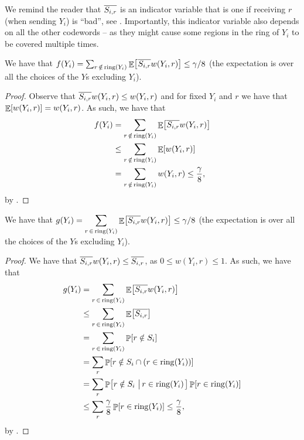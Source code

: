 We remind the reader that $\overline{S_{{i},{r}}}$
is an indicator variable that is one if receiving $r$ (when sending
$Y_i$) is ``bad'', see     . Importantly, this
indicator variable also depends on all the other codewords -- as they
might cause some regions in the ring of $Y_i$ to be covered multiple times.


\begin{lemma}
    We have that
    \begin{math}
        f(Y_i )%
        =%
        \sum_{r \,\notin\, \sring{Y_i}} \Ex{\bigl.\ts
           \smash{\NotInS{i}{r}} w(Y_i, r) } \leq \gamma/8
    \end{math}
    (the expectation is over all the
    choices of the $Y$s excluding $Y_i$).
\end{lemma}
\begin{proof}
    Observe that $\overline{S_{{i},{r}}} w(Y_i, r) \leq w(Y_i,r)$ and for fixed
    $Y_i$ and $r$ we have that $\mathop{\mathbb{E}}\!\left[ {w(Y_i,r)} \right] = w(Y_i,r)$.  As such,
    we have that
    \begin{align*}
        f(Y_i) &= \sum_{r \,\notin\, \sring{Y_i}} \Ex{ \NotInS{i}{r}
           w(Y_i, r) }\\
        &\leq %
        \sum_{r \,\notin\, \sring{Y_i}} \Ex{ w(Y_i, r) } \\
        &= %
        \sum_{r \,\notin\, \sring{Y_i}} w(Y_i, r) \leq
        \frac{\gamma}{8},
    \end{align*}
    by .
\end{proof}

\begin{lemma}
    We have that
    $\ds g(Y_i) = \sum_{r \,\in\, \sring{Y_i}} \Ex{ \NotInS{i}{r}
       w(Y_i, r) } \leq \gamma/8$ (the expectation is over all the
    choices of the $Y$s excluding $Y_i$).

\end{lemma}
\begin{proof}
    We have that $ \overline{S_{{i},{r}}} w(Y_i, r) \leq \overline{S_{{i},{r}}} $, as
    $0 \leq w(Y_i, r) \leq 1$. As such, we have that
    \begin{align*}
      g(Y_i) &=%
               \sum_{r \,\in\, \sring{Y_i}} \Ex{ \NotInS{i}{r} w(Y_i, r) }
               \\&\leq%
               \sum_{r \,\in\, \sring{Y_i}} \Ex{ \NotInS{i}{r} } \\&=%
               \sum_{r \,\in\, \sring{Y_i}} \Prob{r \notin S_i} \\&=%
      \sum_{r } \Prob{r \notin S_i \cap \pth{ r \in \bring{Y_i} }}
      \\
             &= \sum_r \Prob{r \notin S_i \sep{ r \in \bring{Y_i}}} \Prob{r
               \in \bring{Y_i}}
      \\
             &\leq \sum_r \frac{\gamma}{8} \Prob{r \in \bring{Y_i}} \leq
               \frac{\gamma}{8},
    \end{align*}
    by .
\end{proof}


